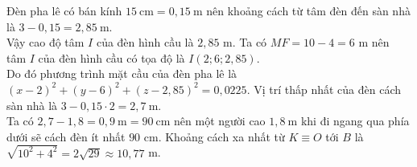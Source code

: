\begin{ex}
{\begin{itemchoice}
		Đèn pha lê có bán  kính $15 \mathrm{~cm}=0{,}15 \mathrm{~m}$ nên khoảng cách từ tâm đèn đến sàn nhà là $3-0{,}15=2{,}85\mathrm{~m}$.\\
		Vậy cao  độ tâm $I$ của đèn hình cầu là $2{,}85$ m.
		\itemch 
		Ta có $M F=10-4=6$ m nên tâm  $I$ của đèn hình cầu có tọa độ là $I(2;6;2{,}85)$.\\
		Do đó phương trình  mặt cầu của đèn pha lê là $(x-2)^2+(y-6)^2+(z-2{,}85)^2=0{,}0225$.
		 \itemch
		Vị trí thấp nhất của đèn cách sàn  nhà là $3-0{,}15 \cdot 2=2{,}7\mathrm{~m}$.\\
		Ta có $2{,}7-1{,}8=0{,}9\mathrm{~m}=90\mathrm{~cm}$ nên  một người cao $1{,}8 \mathrm{~m}$ khi đi ngang qua phía dưới sẽ cách đèn ít nhất $90$ cm.
		\itemch Khoảng cách xa nhất từ $K \equiv O$ tới $B$ là $\sqrt{10^2+4^2}=2  \sqrt{29} \approx 10{,}77$ m.
	\end{itemchoice}
	 }
\end{ex}

